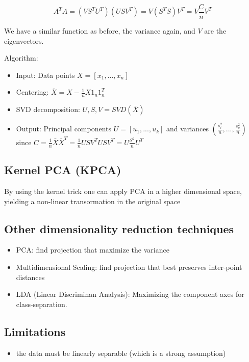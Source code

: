 \documentclass{article}
\begin{document}
\[A^TA=(VS^TU^T)(USV^T)=V(S^TS)V^T=V\frac{C}{n}V^T\]

We have a similar function as before, the variance again, and \(V\) are
the eigenvectors.

Algorithm:

\begin{itemize}
\tightlist
\item
  Input: Data points \(X=[x_1, ..., x_n]\)
\item
  Centering: \(\bar X = X - \frac{1}{n}X1_n1_n^T\)
\item
  SVD decomposition: \(U, S, V = SVD(\bar X)\)
\item
  Output: Principal components \(U = [u_1, ..., u_k]\) and variances
  \((\frac{s_i^2}{n}, ..., \frac{s_k^2}{n})\) since
  \(C = \frac{1}{n} \bar X \bar X^T = \frac{1}{n}USV^TUSV^T= U\frac{S^2}{n}U^T\)
\end{itemize}

\subsection{Kernel PCA (KPCA)}\label{kernel-pca-kpca}

By using the kernel trick one can apply PCA in a higher dimensional
space, yielding a non-linear transormation in the original space

\subsection{Other dimensionality reduction
techniques}\label{other-dimensionality-reduction-techniques}

\begin{itemize}
\tightlist
\item
  PCA: find projection that maximize the variance
\item
  Multidimensional Scaling: find projection that best preserves
  inter-point distances
\item
  LDA (Linear Discriminan Analysis): Maximizing the component axes for
  class-separation.
\end{itemize}

\subsection{Limitations}\label{limitations-1}

\begin{itemize}
\tightlist
\item
  the data must be linearly separable (which is a strong assumption)
\end{itemize}
\end{document}
